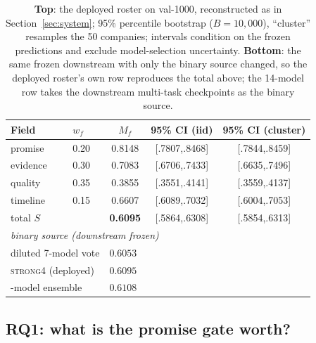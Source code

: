 \begin{table}[t]
  \centering
  \caption{\textbf{Top}: the deployed roster on val-1000, reconstructed as in
  Section~\ref{sec:system}; 95\% percentile bootstrap ($B{=}10{,}000$), ``cluster'' resamples the
  50 companies; intervals condition on the frozen predictions and exclude model-selection
  uncertainty. \textbf{Bottom}: the same frozen downstream with only the binary source changed,
  so the deployed roster's own row reproduces the total above; the 14-model row takes the
  downstream multi-task checkpoints as the binary source.}
  \label{tab:main}
  \footnotesize
  \begin{tabular}{llccc}
    \toprule
    Field & $w_f$ & $M_f$ & 95\% CI (iid) & 95\% CI (cluster) \\
    \midrule
    promise   & 0.20 & 0.8148 & [.7807,.8468] & [.7844,.8459] \\
    evidence  & 0.30 & 0.7083 & [.6706,.7433] & [.6635,.7496] \\
    quality   & 0.35 & 0.3855 & [.3551,.4141] & [.3559,.4137] \\
    timeline  & 0.15 & 0.6607 & [.6089,.7032] & [.6004,.7053] \\
    total $S$ &      & \textbf{0.6095} & [.5864,.6308] & [.5854,.6313] \\
    \midrule
    \multicolumn{5}{l}{\textit{binary source (downstream frozen)}} \\
    \multicolumn{2}{l}{\quad diluted 7-model vote}  & \multicolumn{3}{l}{$0.6053$} \\
    \multicolumn{2}{l}{\quad \textsc{strong4} (deployed)} & \multicolumn{3}{l}{$0.6095$} \\
    \multicolumn{2}{l}{\quad 14-model ensemble}      & \multicolumn{3}{l}{$0.6108$} \\
    \bottomrule
  \end{tabular}
\end{table}

\subsection{RQ1: what is the promise gate worth?}
\label{sec:res:weight}

